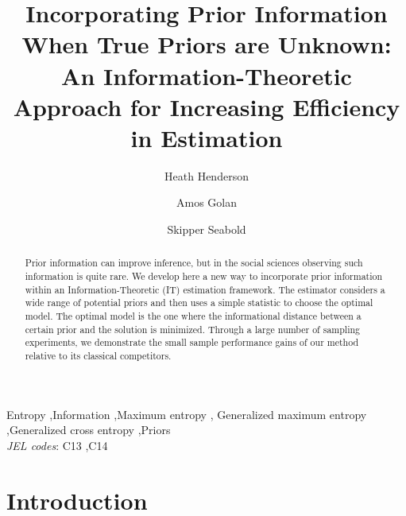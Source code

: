 \documentclass{elsarticle}
\begin{document}
\begin{frontmatter}

\title{Incorporating Prior Information When True Priors are Unknown: An Information-Theoretic 
Approach for Increasing Efficiency in Estimation}

\author[hh]{Heath Henderson}
\author[ag]{Amos Golan}
\author[ss]{Skipper Seabold}

\address[hh]{Department of Economics, Iowa State University}
\address[ag]{Info-Metrics Institute and Department of Economics, 
American University}
\address[ss]{Department of Economics, American University}

\begin{abstract}
Prior information can improve inference, but in the social sciences observing such
information is quite rare.
We develop here a new way to incorporate prior information within an 
Information-Theoretic (IT) estimation framework. 
The estimator considers a wide range of potential priors and then uses a simple statistic 
to choose the optimal model. 
The optimal model is the one where the informational distance between a certain prior and 
the solution is minimized.
Through a large number of sampling experiments, we demonstrate the small sample 
performance gains of our method relative to its classical competitors.
\end{abstract}

\begin{keyword}
Entropy \sep Information \sep Maximum entropy \sep 
Generalized maximum entropy \sep Generalized cross entropy \sep Priors \\
\textit{JEL codes}: C13 \sep C14  
\end{keyword}

\end{frontmatter}

\doublespacing


\section{Introduction}
\label{sec: intro}
\end{document}
